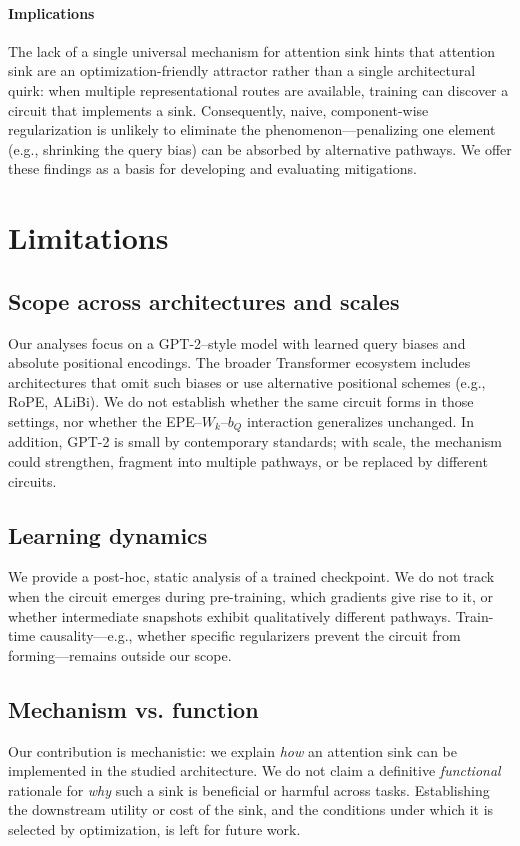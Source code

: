 \documentclass[11pt]{article}
\begin{document}
\paragraph{Implications}
The lack of a single universal mechanism for attention sink hints that attention sink are an optimization-friendly attractor rather than a single architectural quirk: when multiple representational routes are available, training can discover a circuit that implements a sink. Consequently, naive, component-wise regularization is unlikely to eliminate the phenomenon—penalizing one element (e.g., shrinking the query bias) can be absorbed by alternative pathways. We offer these findings as a basis for developing and evaluating mitigations.



\section{Limitations}

\subsection{Scope across architectures and scales}
Our analyses focus on a GPT-2–style model with learned query biases and absolute positional encodings. The broader Transformer ecosystem includes architectures that omit such biases or use alternative positional schemes (e.g., RoPE, ALiBi). We do not establish whether the same circuit forms in those settings, nor whether the EPE–$W_k$–$b_Q$ interaction generalizes unchanged. In addition, GPT-2 is small by contemporary standards; with scale, the mechanism could strengthen, fragment into multiple pathways, or be replaced by different circuits.

\subsection{Learning dynamics}
We provide a post-hoc, static analysis of a trained checkpoint. We do not track when the circuit emerges during pre-training, which gradients give rise to it, or whether intermediate snapshots exhibit qualitatively different pathways. Train-time causality—e.g., whether specific regularizers prevent the circuit from forming—remains outside our scope.

\subsection{Mechanism vs. function}
Our contribution is mechanistic: we explain \emph{how} an attention sink can be implemented in the studied architecture. We do not claim a definitive \emph{functional} rationale for \emph{why} such a sink is beneficial or harmful across tasks. Establishing the downstream utility or cost of the sink, and the conditions under which it is selected by optimization, is left for future work.
\end{document}
